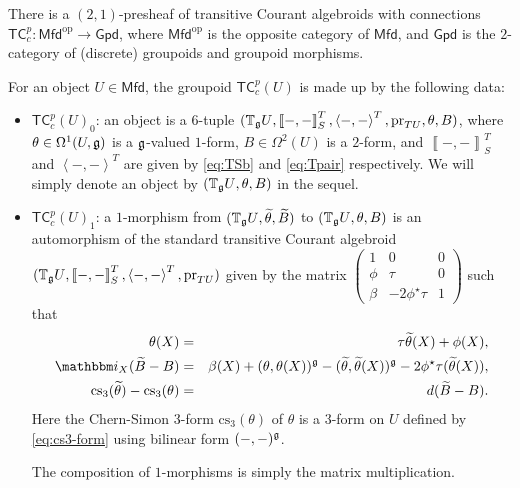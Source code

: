 \documentclass[letterpaper,10pt, oneside]{article} %
\newtheorem{pro}[thm]{Proposition}
\newcommand{\Mfd}{\mathsf{Mfd}}%
\newcommand{\Gpd}{\mathsf{Gpd}}%
\newcommand{\tcalgdp}{{\mathsf{TC}^{p}_{c}}} %
\newcommand{\tagu}{{\mathbb{T}_\g U}}
\newcommand{\op}{\mathrm{op}}%
\newcommand{\ii}{\mathbbm i}
\newcommand{\cs}{\mathrm{cs}}
\newcommand{\pair}[1]{\left\langle #1\right\rangle}
\newcommand{\Courant}[1]{\left\llbracket  #1\right\rrbracket }
\newcommand{\pr}{\mathrm{pr}}
\begin{document}
There is a $(2,1)$-presheaf of transitive Courant algebroids with
connections $\tcalgdp: \Mfd^{\op} \to \Gpd$, where $\Mfd^{\op}$ is the
opposite  category of
$\Mfd$, and $\Gpd$ is the
$2$-category of (discrete) groupoids and groupoid morphisms.

For an object $U\in \Mfd$, the groupoid $\tcalgdp(U)$ is made up
by the following data:
\begin{itemize}
\item{$\tcalgdp(U)_0$}: an object is a $6$-tuple %
$(\tagu, \Courant{-,-}^T_S, \pair{-,-}^T, \pr_{TU}, \theta, B)$, where $\theta\in\Omega^1(U,\mathfrak g)$ is a $\mathfrak g$-valued $1$-form, $B\in \Omega^2(U)$ is a $2$-form, and $\Courant{-,-}^T_S$ and
  $\pair{-,-}^T$ are given by \eqref{eq:TSb} and \eqref{eq:Tpair} respectively. We will simply denote an object by $(\tagu,\theta,B)$ in the sequel.

\item{$\tcalgdp(U)_1$}:  a $1$-morphism from  $(\tagu, \widetilde{\theta},  \widetilde{B} )$ to   $(\tagu,  \theta, B )$   is an automorphism of the standard transitive Courant algebroid $(\tagu,\Courant{-,-}^T_S,  \pair{-,-}^T,\pr_{TU})$ given by the
  matrix
$\left(\begin{array}{ccc}
1&0&0\\
\phi&\tau&0\\
\beta&-2\phi^\star\tau&1
\end{array}\right)$
such that \begin{eqnarray}
\label{eq:congluetc1}\theta(X)&=&\tau\widetilde{\theta}(X)+\phi(X),\\
\label{eq:congluetc2} \ii_X(\widetilde{B}-B)&=&\beta(X)+(\theta,\theta(X))^\g-(\widetilde{\theta},\widetilde{\theta}(X))^\g-2\phi^\star\tau(\widetilde{\theta}(X)),\\
\label{eq:congluetc3}\cs_3(\widetilde{\theta})-\cs_3(\theta)&=&d(\widetilde{B}-B).
 \end{eqnarray}
 Here the Chern-Simon 3-form $\cs_3(\theta)$ of $\theta$ is a $3$-form on $U$ defined by
 \eqref{eq:cs3-form} using bilinear form $(-, -)^\mathfrak g$.

 The
composition of $1$-morphisms is simply the matrix multiplication.
\end{itemize}
\end{document}
